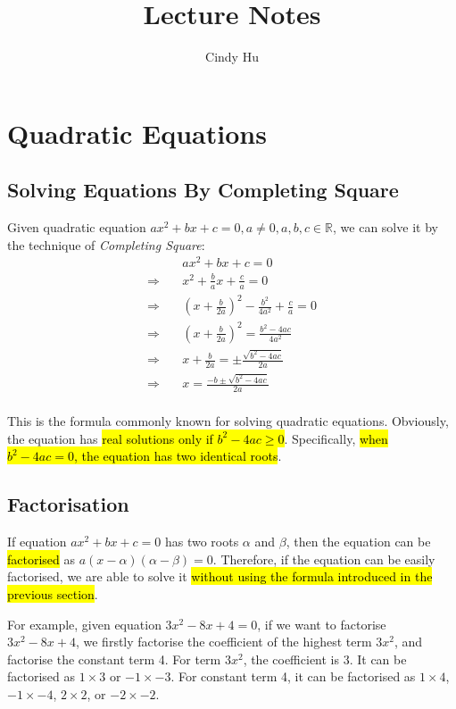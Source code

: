 \documentclass[11pt, oneside]{article}   	%
\title{Lecture Notes}
\author{Cindy Hu}
\begin{document}
\maketitle




\section{Quadratic Equations}
\subsection{Solving Equations By Completing Square}
Given quadratic equation $ax^2+bx+c=0, a \ne 0, a, b, c \in \mathbb{R}$, we can solve it by the technique of \emph{Completing Square}: 
\begin{align*}
& ax^2+bx+c=0\\
\Rightarrow \quad & x^2+\frac{b}{a}x+\frac{c}{a}=0\\
\Rightarrow \quad & (x+\frac{b}{2a})^2-\frac{b^2}{4a^2}+\frac{c}{a}=0\\
\Rightarrow \quad & (x+\frac{b}{2a})^2=\frac{b^2-4ac}{4a^2}\\
\Rightarrow \quad & x+\frac{b}{2a}=\pm \frac{\sqrt{b^2-4ac}}{2a}\\
\Rightarrow \quad & x=\frac{-b \pm \sqrt{b^2-4ac}}{2a}\\
\end{align*}

This is the formula commonly known for solving quadratic equations. Obviously, the equation has \hl{real solutions only if $b^2-4ac \ge 0$}. Specifically, \hl{when $b^2-4ac = 0$, the equation has two identical roots}. \\


\subsection{Factorisation}


If equation $ax^2+bx+c = 0$ has two roots $\alpha$ and $\beta$, then the equation can be \hl{factorised} as $a(x-\alpha)(\alpha-\beta)=0$. Therefore, if the equation can be easily factorised, we are able to solve it \hl{without using the formula introduced in the previous section}. 

For example, given equation $3x^2 - 8x +4=0$, if we want to factorise $3x^2 - 8x +4$, we firstly factorise the coefficient of the highest term $3x^2$, and factorise the constant term 4. For term $3x^2$, the coefficient is 3. It can be factorised as $1 \times 3$ or $-1\times -3$. For constant term 4, it can be factorised as $1 \times 4$, $-1\times -4$, $2\times 2$, or $-2\times -2$. 
\end{document}
